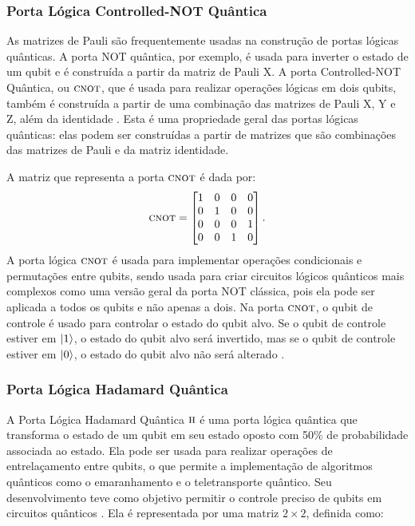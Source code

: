 
\subsubsection{Porta Lógica Controlled-NOT Quântica}\label{sec:cnot}

As matrizes de Pauli são frequentemente usadas na construção de portas lógicas quânticas. A porta NOT quântica, por exemplo, é usada para inverter o estado de um qubit e é construída a partir da matriz de Pauli X. A porta Controlled-NOT Quântica, ou \(\operatorname{\textsc{cnot}}\), que é usada para realizar operações lógicas em dois qubits, também é construída a partir de uma combinação das matrizes de Pauli X, Y e Z, além da identidade \cite{CompInfoQuantica}. Esta é uma propriedade geral das portas lógicas quânticas: elas podem ser construídas a partir de matrizes que são combinações das matrizes de Pauli e da matriz identidade.

A matriz que representa a porta \(\operatorname{\textsc{cnot}}\) é dada por:
\begin{equation}\label{eq:cnot}
\operatorname{\textsc{cnot}} = \begin{bmatrix}
1 & 0 & 0 & 0 \\
0 & 1 & 0 & 0 \\
0 & 0 & 0 & 1 \\
0 & 0 & 1 & 0
\end{bmatrix}.
\end{equation}
A porta lógica \(\operatorname{\textsc{cnot}}\) é usada para implementar operações condicionais e permutações entre qubits, sendo usada para criar circuitos lógicos quânticos mais complexos como uma versão geral da porta NOT clássica, pois ela pode ser aplicada a todos os qubits e não apenas a dois. Na porta \(\operatorname{\textsc{cnot}}\), o qubit de controle é usado para controlar o estado do qubit alvo. Se o qubit de controle estiver em $\ket{1}$, o estado do qubit alvo será invertido, mas se o qubit de controle estiver em $\ket{0}$, o estado do qubit alvo não será alterado \cite{chuang}.


\subsubsection{Porta Lógica Hadamard Quântica}\label{sec:had}

A Porta Lógica Hadamard Quântica \(\operatorname{\textsc{h}}\) é uma porta lógica quântica que transforma o estado de um qubit em seu estado oposto com 50\% de probabilidade associada ao estado. Ela pode ser usada para realizar operações de entrelaçamento entre qubits, o que permite a implementação de algoritmos quânticos como o emaranhamento e o teletransporte quântico. Seu desenvolvimento teve como objetivo permitir o controle preciso de qubits em circuitos quânticos \cite{jorcuvich}. Ela é representada por uma matriz \(2{\times}2\), definida como:

